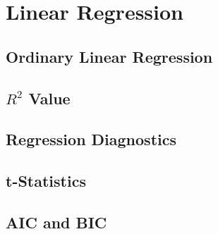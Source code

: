 \chapter{Linear Regression}

\section{Ordinary Linear Regression}

\section{$R^2$ Value}

\section{Regression Diagnostics}

\section{t-Statistics}

\section{AIC and BIC}

\chapauthor{}

